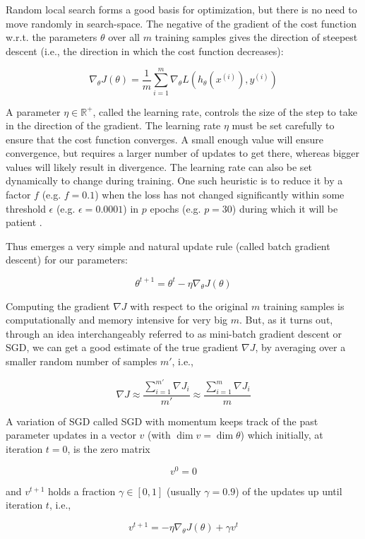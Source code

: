 Random local search forms a good basis for optimization, but there is no need to move randomly in search-space. The negative of the gradient of the cost function w.r.t. the parameters $\theta$ over all $m$ training samples gives the direction of steepest descent (i.e., the direction in which the cost function decreases):

$$
\nabla_{\theta} J(\theta) = \frac{1}{m} \sum_{i=1}^{m} \nabla_{\theta} L(h_{\theta}(x^{(i)}), y^{(i)})
$$

A parameter $\eta \in \mathbb{{R}^{+}}$, called the learning rate, controls the size of the step to take in the direction of the gradient. The learning rate $\eta$ must be set carefully to ensure that the cost function converges. A small enough value will ensure convergence, but requires a larger number of updates to get there, whereas bigger values will likely result in divergence. The learning rate can also be set dynamically to change during training. One such heuristic is to reduce it by a factor $f$ (e.g. $f=0.1$) when the loss has not changed significantly within some threshold $\epsilon$ (e.g. $\epsilon=0.0001$) in $p$ epochs (e.g. $p=30$) during which it will be patient \cite{learningrateschedules}.

Thus emerges a very simple and natural update rule (called batch gradient descent) for our parameters:

$$
\theta^{t+1} = \theta^t - \eta \nabla_{\theta} J(\theta)
$$

Computing the gradient $\nabla J$ with respect to the original $m$ training samples is computationally and memory intensive for very big $m$. But, as it turns out, through an idea interchangeably referred to as mini-batch gradient descent or \ac{SGD}, we can get a good estimate of the true gradient $\nabla J$, by averaging over a smaller random number of samples $m'$, i.e.,

$$
\nabla J \approx \frac{\sum_{i=1}^{m'} \nabla J_i}{m'} \approx \frac{\sum_{i=1}^m \nabla J_{i}}{m}
$$

A variation of \ac{SGD} called \ac{SGD} with momentum \cite{ruder2016} keeps track of the past parameter updates in a vector $v$ (with $\dim v = \dim \theta$) which initially, at iteration $t = 0$, is the zero matrix

$$
v^0 = 0
$$

and $v^{t+1}$ holds a fraction $\gamma \in [0,1]$ (usually $\gamma = 0.9$) of the updates up until iteration $t$, i.e.,

$$
v^{t+1} = -\eta \nabla_{\theta} J(\theta) + \gamma v^{t}
$$

